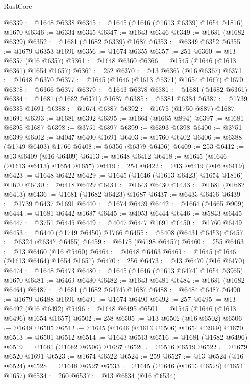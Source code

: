 \begin{lexlean}{RustCore}
\begin{coremodule}
@6339 := @1648 @6338
@6345 := @1645 (@1646 (@1613 @6339) @1654 @1816) @1670
@6346 := @6334 @6345
@6347 := @1643 @6346
@6349 := @1681 (@1682 @6329)
@6352 := @1681 (@1682 @6339) @1687
@6353 := @6349 @6352
@6355 := @1679 @6353 @1691
@6356 := @1674 @6355
@6357 := 251
@6360 := @13 @6357 (@16 @6357)
@6361 := @1648 @6360
@6366 := @1645 (@1646 (@1613 @6361) @1654 @1657)
@6367 := 252
@6370 := @13 @6367 (@16 @6367)
@6371 := @1648 @6370
@6377 := @1645 (@1646 (@1613 @6371) @1654 @1667) @1670
@6378 := @6366 @6377
@6379 := @1643 @6378
@6381 := @1681 (@1682 @6361)
@6384 := @1681 (@1682 @6371) @1687
@6385 := @6381 @6384
@6387 := @1739 @6385 @1691
@6388 := @1674 @6387
@6392 := @1675 (@1750 @887) @1687 @1691
@6393 := @1681 @6392
@6395 := @1664 (@1665 @894)
@6397 := @1681 @6395 @1687
@6398 := @3751 @6397
@6399 := @6393 @6398
@6400 := @3751 @6399
@6402 := @4047 @6400 @1691
@6403 := @1760 @6402
@6406 := @6388 (@1749 @6403) @1766
@6408 := @6356 (@6379 @6406)
@6409 := 253
@6412 := @13 @6409 (@16 @6409)
@6413 := @1648 @6412
@6418 := @1645 (@1646 (@1613 @6413) @1654 @1657)
@6419 := 254
@6422 := @13 @6419 (@16 @6419)
@6423 := @1648 @6422
@6429 := @1645 (@1646 (@1613 @6423) @1654 @1816) @1670
@6430 := @6418 @6429
@6431 := @1643 @6430
@6433 := @1681 (@1682 @6413)
@6436 := @1681 (@1682 @6423) @1687
@6437 := @6433 @6436
@6439 := @1739 @6437 @1691
@6440 := @1674 @6439
@6442 := @1664 (@1665 @909)
@6444 := @1681 @6442 @1687
@6445 := @4053 @6444
@6446 := @5843 @6445
@6447 := @3751 @6446
@6449 := @4047 @6447 @1691
@6450 := @1760 @6449
@6453 := @6440 (@1749 @6450) @1766
@6455 := @6408 (@6431 @6453)
@6457 := @6324 (@6347 @6455)
@6459 := @6175 (@6198 @6457)
@6460 := 255
@6463 := @13 @6460 (@16 @6460)
@6464 := @1648 @6463
@6469 := @1645 (@1646 (@1613 @6464) @1654 @1657)
@6470 := 256
@6473 := @13 @6470 (@16 @6470)
@6474 := @1648 @6473
@6480 := @1645 (@1646 (@1613 @6474) @1654 @3965) @1670
@6481 := @6469 @6480
@6482 := @1643 @6481
@6484 := @1681 (@1682 @6464)
@6487 := @1681 (@1682 @6474) @1687
@6488 := @6484 @6487
@6490 := @1679 @6488 @1691
@6491 := @1674 @6490
@6492 := 257
@6495 := @13 @6492 (@16 @6492)
@6496 := @1648 @6495
@6501 := @1645 (@1646 (@1613 @6496) @1654 @1657)
@6502 := 258
@6505 := @13 @6502 (@16 @6502)
@6506 := @1648 @6505
@6512 := @1645 (@1646 (@1613 @6506) @1654 @3999) @1670
@6513 := @6501 @6512
@6514 := @1643 @6513
@6516 := @1681 (@1682 @6496)
@6519 := @1681 (@1682 @6506) @1687
@6520 := @6516 @6519
@6522 := @1679 @6520 @1691
@6523 := @1674 @6522
@6524 := 259
@6527 := @13 @6524 (@16 @6524)
@6528 := @1648 @6527
@6533 := @1645 (@1646 (@1613 @6528) @1654 @1657)
@6534 := 260
@6537 := @13 @6534 (@16 @6534)

\end{coremodule}
\end{lexlean}

